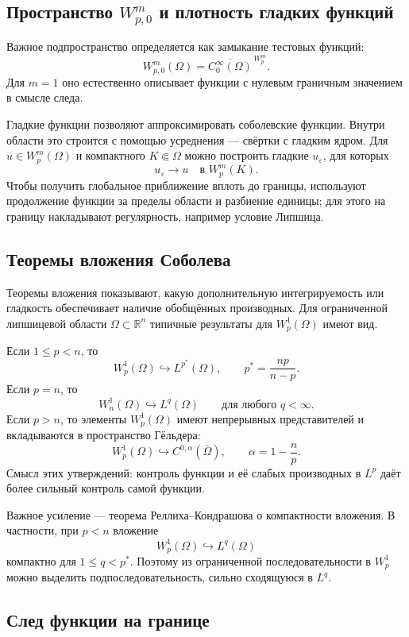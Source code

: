 \subsection{Пространство $W_{p,0}^m$ и плотность гладких функций}

Важное подпространство определяется как замыкание тестовых функций:
\[
    W_{p,0}^m(\Omega)
    =\overline{C_0^\infty(\Omega)}^{\,W_p^m}.
\]
Для $m=1$ оно естественно описывает функции с нулевым граничным значением в
смысле следа.

Гладкие функции позволяют аппроксимировать соболевские функции. Внутри области
это строится с помощью усреднения --- свёртки с гладким ядром. Для
$u\in W_p^m(\Omega)$ и компактного $K\Subset\Omega$ можно построить гладкие
$u_\varepsilon$, для которых
\[
    u_\varepsilon\to u
    \quad\text{в }W_p^m(K).
\]
Чтобы получить глобальное приближение вплоть до границы, используют продолжение
функции за пределы области и разбиение единицы; для этого на границу накладывают
регулярность, например условие Липшица.

\subsection{Теоремы вложения Соболева}

Теоремы вложения показывают, какую дополнительную интегрируемость или гладкость
обеспечивает наличие обобщённых производных. Для ограниченной липшицевой области
$\Omega\subset\mathbb R^n$ типичные результаты для $W_p^1(\Omega)$ имеют вид.

Если $1\leq p<n$, то
\[
    W_p^1(\Omega)\hookrightarrow L^{p^*}(\Omega),
    \qquad
    p^*=\frac{np}{n-p}.
\]
Если $p=n$, то
\[
    W_n^1(\Omega)\hookrightarrow L^q(\Omega)
    \qquad\text{для любого }q<\infty.
\]
Если $p>n$, то элементы $W_p^1(\Omega)$ имеют непрерывных представителей и
вкладываются в пространство Гёльдера:
\[
    W_p^1(\Omega)\hookrightarrow C^{0,\alpha}(\overline\Omega),
    \qquad
    \alpha=1-\frac np.
\]
Смысл этих утверждений: контроль функции и её слабых производных в $L^p$
даёт более сильный контроль самой функции.

Важное усиление --- теорема Реллиха--Кондрашова о компактности вложения. В
частности, при $p<n$ вложение
\[
    W_p^1(\Omega)\hookrightarrow L^q(\Omega)
\]
компактно для $1\leq q<p^*$. Поэтому из ограниченной последовательности в
$W_p^1$ можно выделить подпоследовательность, сильно сходящуюся в $L^q$.

\subsection{След функции на границе}

